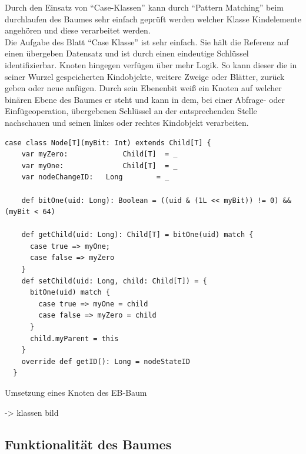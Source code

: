 \documentclass[a4paper,11pt,oneside,%
headsepline,												%
footsepline,												%
bibtotocnumbered									%
]{scrreprt}
\begin{document}
Durch den Einsatz von \enquote{Case-Klassen} kann durch \enquote{Pattern Matching} beim durchlaufen des Baumes sehr einfach geprüft werden welcher Klasse Kindelemente angehören und diese verarbeitet werden.\\

Die Aufgabe des Blatt \enquote{Case Klasse} ist sehr einfach. Sie hält die Referenz auf einen übergeben Datensatz und ist durch einen eindeutige Schlüssel identifizierbar. Knoten hingegen verfügen über mehr Logik. So kann dieser die in seiner Wurzel gespeicherten Kindobjekte, weitere Zweige oder Blätter, zurück geben oder neue anfügen. Durch sein Ebenenbit weiß ein Knoten auf welcher binären Ebene des Baumes er steht und kann in dem, bei einer Abfrage- oder Einfügeoperation, übergebenen Schlüssel an der entsprechenden Stelle nachschauen und seinen linkes oder rechtes Kindobjekt verarbeiten.

\begin{listing}[H]
	\begin{verbatim}
case class Node[T](myBit: Int) extends Child[T] {
    var myZero:				Child[T]  = _
    var myOne:				Child[T]  = _
    var nodeChangeID:	Long    	= _

    def bitOne(uid: Long): Boolean = ((uid & (1L << myBit)) != 0) && (myBit < 64)

    def getChild(uid: Long): Child[T] = bitOne(uid) match {
      case true => myOne;
      case false => myZero
    }
    def setChild(uid: Long, child: Child[T]) = {
      bitOne(uid) match {
        case true => myOne = child
        case false => myZero = child
      }
      child.myParent = this
    }
    override def getID(): Long = nodeStateID
  }	
	\end{verbatim}
	\caption{Umsetzung eines Knoten des \ac{EB-Baum}}
	\label{lst:Knoten EB-Baum}
\end{listing}

-> klassen bild\\
\subsection{Funktionalität des Baumes}
\end{document}
